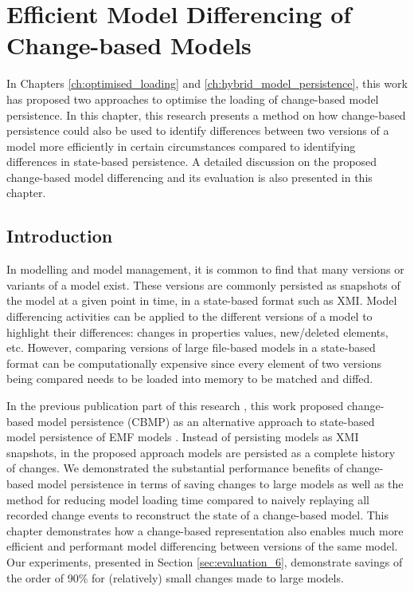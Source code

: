 \chapter{Efficient Model Differencing of Change-based Models}
\label{ch:model_differencing}


In Chapters \ref{ch:optimised_loading} and \ref{ch:hybrid_model_persistence}, this work has proposed two approaches to optimise the loading of change-based model persistence. In this chapter, this research presents a method on how change-based persistence could also be used to identify differences between two versions of a model more efficiently in certain circumstances compared to identifying differences in state-based persistence. A detailed discussion on the proposed change-based model differencing and its evaluation is also presented in this chapter.

\section{Introduction}
\label{sec:introduction_06}
In modelling and model management, it is common to find that many versions or variants of a model exist. These versions are commonly persisted as snapshots of the model at a given point in time, in a state-based format such as XMI. Model differencing activities can be applied to the different versions of a model to highlight their differences: changes in properties values, new/deleted elements, etc. However, comparing versions of large file-based
models in a state-based format can be computationally expensive since every element of two versions being compared needs to be loaded into memory to be matched and diffed. 

In the previous publication part of this research \cite{DBLP:conf/models/YohannisKP17,yohannis2018towards,DBLP:conf/models/YohannisRPK18}, this work proposed change-based model persistence (CBMP) as an alternative approach to state-based model persistence of EMF models \cite{steinberg2008emf}. Instead of persisting models as XMI snapshots, in the proposed approach models are persisted as a complete history of changes. We demonstrated the substantial performance benefits of change-based model persistence in terms of saving changes to large models \cite{DBLP:conf/models/YohannisKP17} as well as the method for reducing model loading time compared to naively replaying all recorded change events \cite{DBLP:conf/models/YohannisRPK18} to reconstruct the state of a change-based model. 
This chapter demonstrates how a change-based representation also enables much more efficient and performant model differencing between versions of the same model. Our experiments, presented in Section \ref{sec:evaluation_6}, demonstrate savings of the order of 90\% for (relatively) small changes made to large models.

